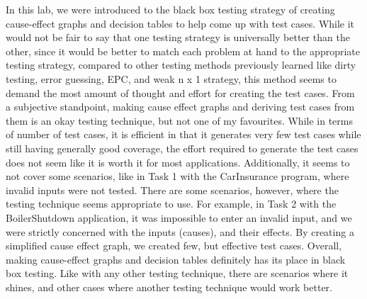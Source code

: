 In this lab, we were introduced to the black box testing strategy of creating
cause-effect graphs and decision tables to help come up with test cases. 
While it would not be fair to say that one testing strategy
is universally better than the other, since it would be better to match
each problem at hand to the appropriate testing strategy, compared to other
testing methods previously learned like dirty testing, error guessing, EPC, and
weak n x 1 strategy, this method seems to demand the most amount of thought and
effort for creating the test cases. 
From a subjective standpoint, making cause effect graphs and deriving test
cases from them is an okay testing technique, but not one of my favourites.
While in terms of number of test cases, it is efficient in that it generates
very few test cases while still having generally good coverage, the effort
required to generate the test cases does not seem like it is worth it for most
applications. Additionally, it seems to not cover some scenarios, like in
Task 1 with the CarInsurance program, where invalid inputs were not tested.
There are some scenarios, however, where the testing technique seems
appropriate to use. For example, in Task 2 with the BoilerShutdown application,
it was impossible to enter an invalid input, and we were strictly concerned
with the inputs (causes), and their effects. By creating a simplified
cause effect graph, we created few, but effective test cases. Overall, making
cause-effect graphs and decision tables definitely has its place in black box
testing. Like with any other testing technique, there are scenarios where it
shines, and other cases where another testing technique would work better.


